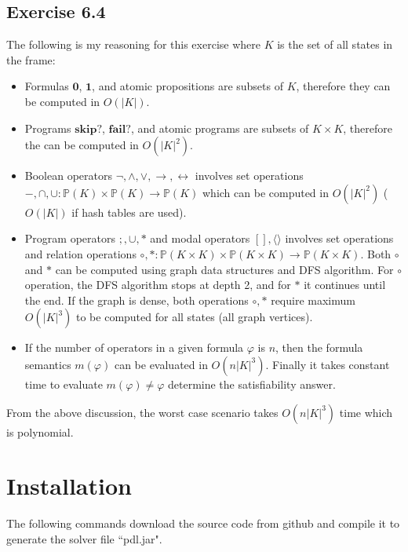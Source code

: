\documentclass[12pt,a4paper]{article}
\begin{document}
\subsection{Exercise 6.4}

 The following is my reasoning for this exercise where $K$ is the set of all states in the frame:
\begin{itemize}
\item Formulas $\textbf{0}$, $\textbf{1}$, and atomic propositions are subsets of $K$, therefore they can be computed in $O(\vert K \vert)$.
\item Programs $\textbf{skip}?$, $\textbf{fail}?$, and atomic programs are subsets of $K \times K$, therefore the can be computed in $O(\vert K \vert^2)$.

\item Boolean operators $\neg, \wedge, \vee, \rightarrow, \leftrightarrow$ involves set operations $-, \cap, \cup: \mathbb{P}(K) \times \mathbb{P}(K) \rightarrow \mathbb{P}(K)$ which can be computed in $O(\vert K \vert^2)$ ($O(\vert K \vert)$ if hash tables are used).

\item Program operators $;, \cup, *$ and modal operators $[], \langle \rangle$ involves set operations and relation operations $\circ, *: \mathbb{P}(K \times K) \times \mathbb{P}(K \times K) \rightarrow \mathbb{P}(K \times K)$. Both $\circ$ and $*$ can be computed using graph data structures and DFS algorithm. 
For $\circ$ operation, the DFS algorithm stops at depth 2, and for $*$ it continues until the end. 
If the graph is dense, both operations $\circ, *$ require maximum $O(\vert K \vert^3)$ to be computed for all states (all graph vertices). 

\item If the number of operators in a given formula $\varphi$ is $n$, then the formula semantics $m(\varphi)$ can be evaluated in $O(n \vert K \vert ^3)$. Finally it takes constant time to evaluate $m(\varphi) \neq \varphi$   determine the satisfiability answer. 
\end{itemize}

From the above discussion, the worst case scenario takes $O(n \vert K \vert ^3)$ time which is polynomial. 

\section{Installation}

The following commands download the source code from github and compile it to generate the solver file ``pdl.jar". 
\end{document}
